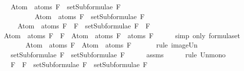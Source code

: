 \begin{isabellebody}
\ \ \ {\isachardoublequoteopen}Atom\ {\isacharbackquote}\ atoms\ F{}\ {\isasymsubseteq}\ setSubformulae\ F{}{\isachardoublequoteclose}\isanewline
\ \ \ \ \ \ \ \ \ \ {\isachardoublequoteopen}Atom\ {\isacharbackquote}\ atoms\ F{}\ {\isasymsubseteq}\ setSubformulae\ F{}{\isachardoublequoteclose}\isanewline
\ \ \ \ \ {\isachardoublequoteopen}Atom\ {\isacharbackquote}\ atoms\ {\isacharparenleft}F{}\ \isactrlbold {\isasymand}\ F{}{\isacharparenright}\ {\isasymsubseteq}\ setSubformulae\ {\isacharparenleft}F{}\ \isactrlbold {\isasymand}\ F{}{\isacharparenright}{\isachardoublequoteclose}\isanewline
%
\isadelimproof
%
\endisadelimproof
%
\isatagproof
{}\isamarkupfalse%
\ {\isacharminus}\isanewline
\ \ \isamarkupfalse%
\ {\isachardoublequoteopen}Atom\ {\isacharbackquote}\ atoms\ {\isacharparenleft}F{}\ \isactrlbold {\isasymand}\ F{}{\isacharparenright}\ {\isacharequal}\ Atom\ {\isacharbackquote}\ {\isacharparenleft}atoms\ F{}\ {\isasymunion}\ atoms\ F{}{\isacharparenright}{\isachardoublequoteclose}\isanewline
\ \ \ \ \isamarkupfalse%
\ {\isacharparenleft}simp\ only{\isacharcolon}\ formula{\isachardot}set{\isacharparenleft}{}{\isacharparenright}{\isacharparenright}\isanewline
\ \ \isamarkupfalse%
\ \isamarkupfalse%
\ {\isachardoublequoteopen}{\isasymdots}\ {\isacharequal}\ Atom\ {\isacharbackquote}\ atoms\ F{}\ {\isasymunion}\ Atom\ {\isacharbackquote}\ atoms\ F{}{\isachardoublequoteclose}\ \isanewline
\ \ \ \ \isamarkupfalse%
\ {\isacharparenleft}rule\ image{\isacharunderscore}Un{\isacharparenright}\isanewline
\ \ \isamarkupfalse%
\ \isamarkupfalse%
\ {\isachardoublequoteopen}{\isasymdots}\ {\isasymsubseteq}\ setSubformulae\ F{}\ {\isasymunion}\ setSubformulae\ F{}{\isachardoublequoteclose}\isanewline
\ \ \ \ \isamarkupfalse%
\ assms\isanewline
\ \ \ \ \isamarkupfalse%
\ {\isacharparenleft}rule\ Un{\isacharunderscore}mono{\isacharparenright}\isanewline
\ \ \isamarkupfalse%
\ \isamarkupfalse%
\ {\isachardoublequoteopen}{\isasymdots}\ {\isasymsubseteq}\ {\isacharbraceleft}F{}\ \isactrlbold {\isasymand}\ F{}{\isacharbraceright}\ {\isasymunion}\ {\isacharparenleft}setSubformulae\ F{}\ {\isasymunion}\ setSubformulae\ F{}{\isacharparenright}{\isachardoublequoteclose}\isanewline

\end{isabellebody}
